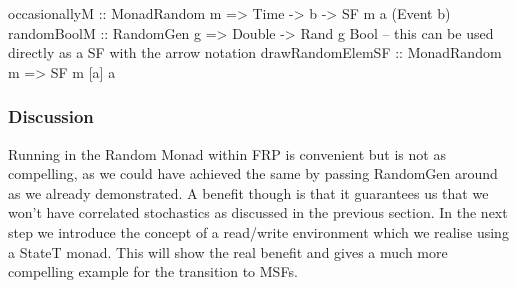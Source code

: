 \begin{HaskellCode}
occasionallyM :: MonadRandom m => Time -> b -> SF m a (Event b)
randomBoolM :: RandomGen g => Double -> Rand g Bool
-- this can be used directly as a SF with the arrow notation
drawRandomElemSF :: MonadRandom m => SF m [a] a
\end{HaskellCode}

\subsubsection{Discussion} 
Running in the Random Monad within FRP is convenient but is not as compelling, as we could have achieved the same by passing RandomGen around as we already demonstrated. A benefit though is that it guarantees us that we won't have correlated stochastics as discussed in the previous section. In the next step we introduce the concept of a read/write environment which we realise using a StateT monad. This will show the real benefit and gives a much more compelling example for the transition to MSFs.